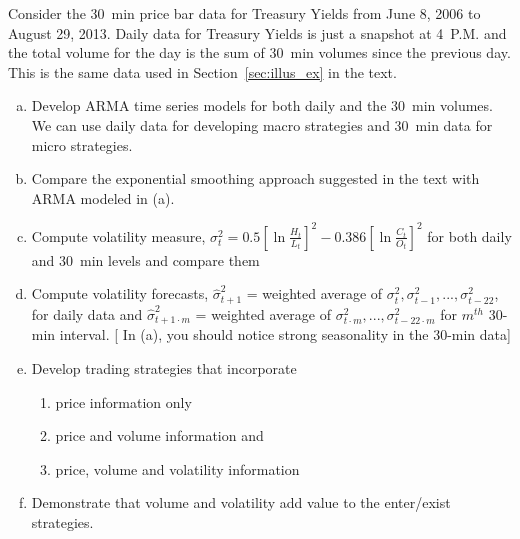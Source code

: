 \prob Consider the 30~min price bar data for Treasury Yields from June 8, 2006 to August 29, 2013. Daily data for Treasury Yields is just a snapshot at 4~P.M. and the total volume for the day is the sum of 30~min volumes since the previous day. This is the same data used in Section~\ref{sec:illus_ex} in the text.
   \begin{enumerate}[(a)]
   \item Develop ARMA time series models for both daily and the 30~min volumes. We can use daily data
for developing macro strategies and 30~min data for micro strategies.
\item Compare the exponential smoothing approach suggested in the text with ARMA modeled in (a).
   \item Compute volatility measure, $\sigma_t^2 = 0.5[\ln{\frac{H_t}{L_t}}]^2 - 0.386[\ln{\frac{C_t}{O_t}}]^2$ for both daily and 30~min levels and compare them
   \item Compute volatility forecasts, $\hat{\sigma}_{t+1}^2$ = weighted average of $\sigma_{t}^2, \sigma_{t-1}^2,...,\sigma_{t-22}^2$, for daily data and $\hat{\sigma}_{t+1\cdot m}^2$ = weighted average of $\sigma_{t\cdot m}^2,...,\sigma_{t-22\cdot m}^2$ for $m^{th}$ 30-min interval. [ In (a), you should notice strong seasonality in the 30-min data]
   \item Develop trading strategies that incorporate
      \begin{enumerate}
      \item price information only
      \item price and volume information and
      \item price, volume and volatility information
      \end{enumerate}
         \item Demonstrate that volume and volatility add value to the enter/exist strategies.
   \end{enumerate}




 


\addtocounter{total}{\theproblem}